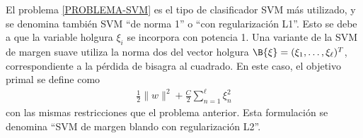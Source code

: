 El problema \ref{PROBLEMA-SVM} es el tipo de clasificador SVM más utilizado,
y se denomina también SVM ``de norma 1'' o ``con regularización L1''. Esto
se debe a que la variable holgura $\xi_i$ se incorpora con potencia 1.
Una variante de la SVM de margen suave utiliza la norma dos del
vector holgura $\B{\xi}=(\xi_1,\ldots,\xi_\ell)^T$, correspondiente
a la pérdida de bisagra al cuadrado. En este caso, el objetivo primal
se define como
%
\begin{align}
  \label{svm-l2}
  \frac{1}{2}\|w\|^2+\frac{C}{2}\sum_{n=1}^{\ell}\xi_n^2
\end{align}
%
con las mismas restricciones que el problema anterior.
Esta formulación se denomina ``SVM de margen blando con regularización L2''.
